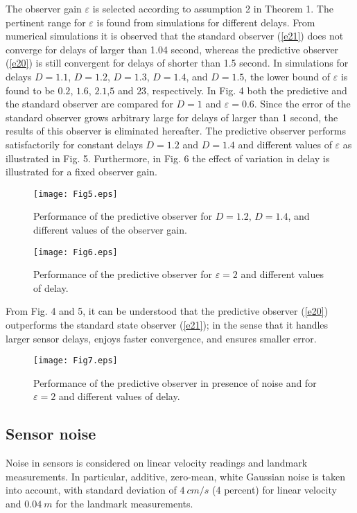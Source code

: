 \documentclass[12pt,draftcls,onecolumn]{IEEEtran}
\begin{document}
The observer gain $ \varepsilon $ is  selected according to assumption 2 in Theorem 1. The pertinent range for $ \varepsilon $ is found from simulations for different delays. From numerical simulations it is observed that the standard observer (\ref{e21}) does not converge for delays of larger than 1.04 second, whereas the predictive observer (\ref{e20}) is still convergent for delays of shorter than 1.5 second. In simulations for delays $D=1.1$, $D=1.2$, $D=1.3$, $D=1.4$, and $D=1.5$, the lower bound of $ \varepsilon $ is found to be $0.2$, $1.6$, $2.1$,$5$ and $23$, respectively.
In Fig. 4 both the predictive and the standard observer are compared for $D=1$ and $ \varepsilon=0.6 $. Since the error of the standard observer grows arbitrary large for delays of larger than 1 second, the results of this observer is eliminated hereafter. The predictive observer performs satisfactorily for constant delays $D=1.2$ and  $D=1.4$ and different values of $ \varepsilon$ as illustrated in Fig. 5. Furthermore, in Fig. 6 the effect of variation in delay is illustrated for a fixed observer gain.
\begin{figure}[thpb] \label{F5}
\centering
\texttt{[image: Fig5.eps]}
\caption{Performance of the predictive observer for $D=1.2$, $D=1.4$, and different values of the observer gain.}
\end{figure}

\begin{figure}[thpb] \label{F6}
\centering
\texttt{[image: Fig6.eps]}
\caption{Performance of the predictive observer for $ \varepsilon=2 $ and different values of delay.}
\end{figure}
From Fig. 4 and 5, it can be understood that the predictive observer (\ref{e20}) outperforms the standard state observer (\ref{e21}); in the sense that it handles larger sensor delays, enjoys faster convergence, and ensures smaller error.

\begin{figure}[thpb]
\centering
\texttt{[image: Fig7.eps]}
\caption{Performance of the predictive observer in presence of noise and for $\varepsilon = 2$ and different values of delay.}
\label{F7}
\end{figure}


 \subsection{Sensor noise} Noise in sensors is considered on linear velocity readings and landmark measurements. In particular, additive, zero-mean, white Gaussian noise is taken into account, with standard deviation of $4 ~cm/s$ (4 percent) for linear velocity and $0.04~m$ for the landmark measurements.
\end{document}

